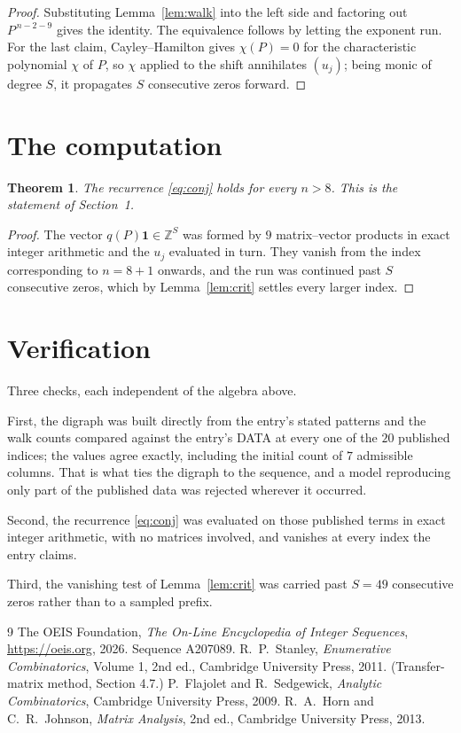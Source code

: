 \documentclass[11pt,a4paper]{article}
\theoremstyle{plain}
\newtheorem{theorem}{Theorem}
\theoremstyle{definition}
\begin{document}
\begin{proof}
Substituting Lemma~\ref{lem:walk} into the left side and factoring out
$P^{\,n-2-9}$ gives the identity. The equivalence follows by letting the exponent
run. For the last claim, Cayley--Hamilton gives $\chi(P)=0$ for the characteristic
polynomial $\chi$ of $P$, so $\chi$ applied to the shift annihilates $(u_j)$; being monic of
degree $S$, it propagates $S$ consecutive zeros forward.
\end{proof}

\section{The computation}

\begin{theorem}
The recurrence \eqref{eq:conj} holds for every $n>8$. This is the statement of
Section~1.
\end{theorem}

\begin{proof}
The vector $q(P)\mathbf{1}\in\mathbb{Z}^{S}$ was formed by $9$ matrix--vector
products in exact integer arithmetic and the $u_j$ evaluated in turn. They vanish from the
index corresponding to $n=8+1$ onwards, and the run was continued past $S$ consecutive
zeros, which by Lemma~\ref{lem:crit} settles every larger index.
\end{proof}

\section{Verification}

Three checks, each independent of the algebra above.

First, the digraph was built directly from the entry's stated patterns and the walk counts
compared against the entry's DATA at every one of the $20$ published indices; the
values agree exactly, including the initial count of $7$ admissible columns. That is
what ties the digraph to the sequence, and a model reproducing only part of the published
data was rejected wherever it occurred.

Second, the recurrence \eqref{eq:conj} was evaluated on those published terms in exact
integer arithmetic, with no matrices involved, and vanishes at every index the entry claims.

Third, the vanishing test of Lemma~\ref{lem:crit} was carried past $S=49$ consecutive
zeros rather than to a sampled prefix.

\begin{thebibliography}{9}
 The OEIS Foundation, \emph{The On-Line Encyclopedia of Integer
Sequences}, \url{https://oeis.org}, 2026. Sequence A207089.
 R.~P.~Stanley, \emph{Enumerative Combinatorics}, Volume 1, 2nd ed.,
Cambridge University Press, 2011. (Transfer-matrix method, Section 4.7.)
 P.~Flajolet and R.~Sedgewick, \emph{Analytic Combinatorics}, Cambridge
University Press, 2009.
 R.~A.~Horn and C.~R.~Johnson, \emph{Matrix Analysis}, 2nd ed., Cambridge
University Press, 2013.
\end{thebibliography}
\end{document}

